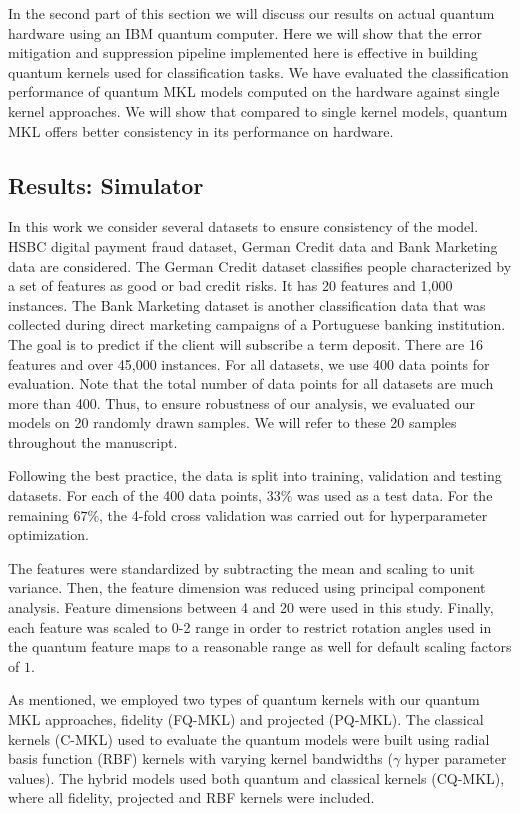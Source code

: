 \documentclass[reprint,amsfonts, amssymb, amsmath,  showkeys, nofootinbib,pra, superscriptaddress, twocolumn,longbibliography]{revtex4-2}
\begin{document}
In the second part of this section we will discuss our results on actual quantum hardware using an IBM quantum computer. Here we will show that the error mitigation and suppression pipeline implemented here is effective in building quantum kernels used for classification tasks. We have evaluated the classification performance of quantum MKL models computed on the hardware against single kernel approaches. We will show that compared to single kernel models, quantum MKL offers better consistency in its performance on hardware.

\subsection{Results: Simulator}

In this work we consider several datasets to ensure consistency of the model. HSBC digital payment fraud dataset, German Credit data \cite{misc_statlog_(german_credit_data)_144} and Bank Marketing data \cite{MORO201422} are considered. 
The German Credit dataset classifies people characterized by a set of features as good or bad credit risks. It has 20 features and 1,000 instances.
The Bank Marketing dataset is another classification data that was collected during direct marketing campaigns of a Portuguese banking institution. The goal is to predict if the client will subscribe a term deposit. There are 16 features and over 45,000 instances.
For all datasets, we use 400 data points for evaluation. Note that the total number of data points for all datasets are much more than 400.
Thus, to ensure robustness of our analysis, we evaluated our models on 20 randomly drawn samples. We will refer to these 20 samples throughout the manuscript.

Following the best practice, the data is split into training, validation and testing datasets. For each of the 400 data points, $33\%$ was used as a test data. For the remaining $67\%$, the 4-fold cross validation was carried out for hyperparameter optimization. 

The features were standardized by subtracting the mean and scaling to unit variance. Then, the feature dimension was reduced using principal component analysis. Feature dimensions between 4 and 20 were used in this study. Finally, each feature was scaled to 0-2 range in order to restrict rotation angles used in the quantum feature maps to a reasonable range as well for default scaling factors of $1$. 

As mentioned, we employed two types of quantum kernels with our quantum MKL approaches, fidelity (FQ-MKL) and projected (PQ-MKL).
The classical kernels (C-MKL) used to evaluate the quantum models were built using radial basis function (RBF) kernels with varying kernel bandwidths ($\gamma$ hyper parameter values). The hybrid models used both quantum and classical kernels (CQ-MKL), where all fidelity, projected and RBF kernels were included. 
\end{document}
